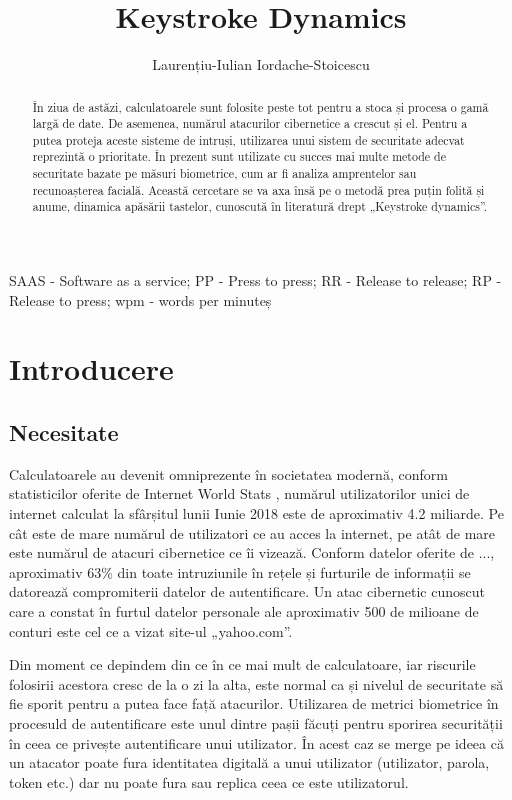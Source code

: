 \documentclass[9pt,shortpaper,twoside,web]{ieeecolor}
\begin{document}
\title{Keystroke Dynamics}
\author{Laurențiu-Iulian Iordache-Stoicescu }

\maketitle


\begin{abstract}
În ziua de astăzi, calculatoarele sunt folosite peste tot pentru a stoca și procesa o gamă largă de date. De asemenea, numărul atacurilor cibernetice a crescut și el. Pentru a putea proteja aceste sisteme de intruși, utilizarea unui sistem de securitate adecvat reprezintă o prioritate. În prezent sunt utilizate cu succes mai multe metode de securitate bazate pe măsuri biometrice, cum ar fi analiza amprentelor sau recunoașterea facială. Această cercetare se va axa însă pe o metodă prea puțin folită și anume, dinamica apăsării tastelor, cunoscută în literatură drept „Keystroke dynamics”.
\end{abstract}

\begin{IEEEkeywords}
SAAS - Software as a service;
PP - Press to press; 
RR - Release to release; 
RP - Release to press;
wpm - words per minuteș
\end{IEEEkeywords}


\section{Introducere}
\label{sec:introduction}


\subsection{Necesitate}
	Calculatoarele au devenit omniprezente în societatea modernă, conform statisticilor oferite de Internet World Stats \cite{b1}, numărul utilizatorilor unici de internet calculat la sfârșitul lunii Iunie 2018 este de aproximativ 4.2 miliarde. Pe cât este de mare numărul de utilizatori ce au acces la internet, pe atât de mare este numărul de atacuri cibernetice ce îi vizează. Conform datelor oferite de ..., aproximativ 63\% din toate intruziunile în rețele și furturile de informații se datorează compromiterii datelor de autentificare. Un atac cibernetic cunoscut care a constat în furtul datelor personale ale aproximativ 500 de milioane de conturi este cel ce a vizat site-ul „yahoo.com”.

	Din moment ce depindem din ce în ce mai mult de calculatoare, iar riscurile folosirii acestora cresc de la o zi la alta, este normal ca și nivelul de securitate să fie sporit pentru a putea face față atacurilor. Utilizarea de metrici biometrice în procesuld de autentificare este unul dintre pașii făcuți pentru sporirea securității în ceea ce privește autentificare unui utilizator. În acest caz se merge pe ideea că un atacator poate fura identitatea digitală a unui utilizator (utilizator, parola, token etc.) dar nu poate fura sau replica ceea ce este utilizatorul.
\end{document}
